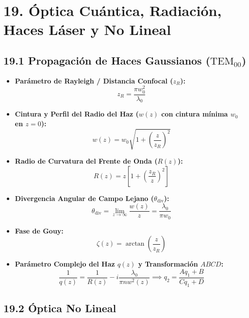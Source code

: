 \documentclass[11pt,a4paper]{article}
\begin{document}
\section*{19. Óptica Cuántica, Radiación, Haces Láser y No Lineal}

\subsection*{19.1 Propagación de Haces Gaussianos ($\mathrm{TEM}_{00}$)}

\begin{itemize}
  \item \textbf{Parámetro de Rayleigh / Distancia Confocal ($z_R$):}
  \[
    z_R = \frac{\pi w_0^2}{\lambda_0}
  \]
  \item \textbf{Cintura y Perfil del Radio del Haz ($w(z)$ con cintura mínima $w_0$ en $z=0$):}
  \[
    w(z) = w_0 \sqrt{1 + \left( \frac{z}{z_R} \right)^2}
  \]
  \item \textbf{Radio de Curvatura del Frente de Onda ($R(z)$):}
  \[
    R(z) = z \left[ 1 + \left( \frac{z_R}{z} \right)^2 \right]
  \]
  \item \textbf{Divergencia Angular de Campo Lejano ($\theta_{\mathrm{div}}$):}
  \[
    \theta_{\mathrm{div}} = \lim_{z \to \infty} \frac{w(z)}{z} = \frac{\lambda_0}{\pi w_0}
  \]
  \item \textbf{Fase de Gouy:}
  \[
    \zeta(z) = \arctan\left( \frac{z}{z_R} \right)
  \]
  \item \textbf{Parámetro Complejo del Haz $q(z)$ y Transformación $ABCD$:}
  \[
    \frac{1}{q(z)} = \frac{1}{R(z)} - i \frac{\lambda_0}{\pi n w^2(z)} \implies q_2 = \frac{A q_1 + B}{C q_1 + D}
  \]
\end{itemize}

\subsection*{19.2 Óptica No Lineal}
\end{document}
